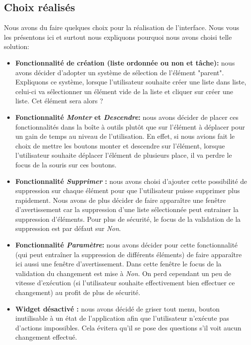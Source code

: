 \documentclass[a4paper,10pt]{article}
\begin{document}
\subsection{Choix réalisés}
Nous avons du faire quelques choix pour la réalisation de l'interface. Nous vous les présentons ici et surtout nous expliquons pourquoi nous avons choisi telle solution:
\begin{itemize}
\item \textbf{Fonctionnalité de création (liste ordonnée ou non et tâche):} nous avons décider d'adopter un système de sélection de l'élément "parent". Expliquons ce système, lorsque l'utilisateur souhaite créer une liste dans liste, celui-ci va sélectionner un élément vide de la liste et cliquer sur créer une liste. Cet élément sera alors ?
\item \textbf{Fonctionnalité \textit{Monter} et \textit{Descendre}:} nous avons décider de placer ces fonctionnalités dans la boîte à outils plutôt que sur l'élément à déplacer pour un gain de temps au niveau de l'utilisation. En effet, si nous avions fait le choix de mettre les boutons monter et descendre sur l'élément, lorsque l'utilisateur souhaite déplacer l'élément de plusieurs place, il va perdre le focus de la souris sur ces boutons.
\item \textbf{Fonctionnalité \textit{Supprimer} :} nous avons choisi d'ajouter cette possibilité de suppression sur chaque élément pour que l'utilisateur puisse supprimer plus rapidement. Nous avons de plus décider de faire apparaître une fenêtre d'avertissement car la suppression d'une liste sélectionnée peut entrainer la suppression d'éléments. Pour plus de sécurité, le focus de la validation de la suppression est par défaut sur \textit{Non}.
\item \textbf{Fonctionnalité \textit{Paramètre}:} nous avons décider pour cette fonctionnalité (qui peut entraîner la suppression de différents éléments) de faire apparaître ici aussi une fenêtre d'avertissement. Dans cette fenêtre le focus de la validation du changement est mise à \textit{Non}. On perd cependant un peu de vitesse d'exécution (si l'utilisateur souhaite effectivement bien effectuer ce changement) au profit de plus de sécurité. %
\item \textbf{Widget désactivé :} nous avons décidé de griser tout menu, bouton inutilisable à un état de l'application afin que l'utilisateur n'exécute pas d'actions impossibles. Cela évitera qu'il se pose des questions s'il voit aucun changement effectué.
\end{itemize}
\end{document}
